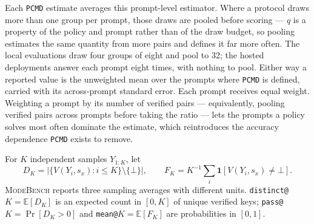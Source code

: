 \documentclass{article}
\newcommand{\1}{\mathbf 1}
\newcommand{\E}{\mathbb E}
\newcommand{\mb}{\textsc{ModeBench}}
\newcommand{\pmd}{\texttt{PCMD}}
\theoremstyle{remark}
\theoremstyle{definition}
\theoremstyle{plain}
\begin{document}
Each \pmd{} estimate averages this prompt-level estimator. Where a protocol draws
more than one group per prompt, those draws are pooled before scoring --- $q$
is a property of the policy and prompt rather than of the draw budget, so
pooling estimates the same quantity from more pairs and defines it far more
often. The local evaluations draw four groups of eight and pool to 32; the
hosted deployments answer each prompt eight times, with nothing to pool. Either
way a reported value is the unweighted mean over the prompts where \pmd{} is
defined, carried with its across-prompt standard error. Each prompt receives equal weight. Weighting a prompt by its number of verified pairs --- equivalently, pooling verified pairs across prompts before
taking the ratio --- lets the prompts a
policy solves most often dominate the estimate, which reintroduces the accuracy
dependence \pmd{} exists to remove.

For $K$ independent samples $Y_{1:K}$, let
\[
  D_K=\bigl|\{V(Y_i,s_x):i\le K\}\setminus\{\bot\}\bigr|,
  \qquad
  F_K=K^{-1}\sum_i \1[V(Y_i,s_x)\neq\bot].
\]
\mb{} reports three sampling averages with different units. \texttt{distinct@}$K
=\E[D_K]$ is an expected count in $[0,K]$ of unique verified keys;
\texttt{pass@}$K=\Pr[D_K>0]$ and \texttt{mean@}$K=\E[F_K]$ are probabilities
in $[0,1]$.
\end{document}
